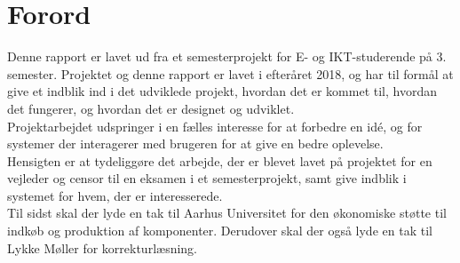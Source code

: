 \documentclass[Rapport/Rapport_main.tex]{subfiles}
\begin{document}
\section{Forord}
Denne rapport er lavet ud fra et semesterprojekt for E- og IKT-studerende på 3. semester. Projektet og denne rapport er lavet i efteråret 2018, og har til formål at give et indblik ind i det udviklede projekt, hvordan det er kommet til, hvordan det fungerer, og hvordan det er designet og udviklet. 
\\Projektarbejdet udspringer i en fælles interesse for at forbedre en idé, og for systemer der interagerer med brugeren for at give en bedre oplevelse.  
\\Hensigten er at tydeliggøre det arbejde, der er blevet lavet på projektet for en vejleder og censor til en eksamen i et semesterprojekt, samt give indblik i systemet for hvem, der er interesserede.
\\Til sidst skal der lyde en tak til Aarhus Universitet for den økonomiske støtte til indkøb og produktion af komponenter. Derudover skal der også lyde en tak til Lykke Møller for korrekturlæsning.
\end{document}
